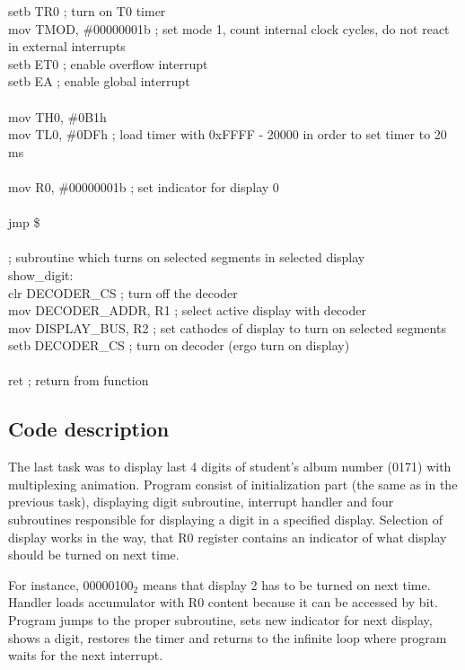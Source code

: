 \documentclass{article}
\begin{document}
    setb    TR0                 ; turn on T0 timer\\
    mov     TMOD, \#00000001b    ; set mode 1, count internal clock cycles, do not react in external interrupts\\
    setb    ET0                 ; enable overflow interrupt\\
    setb    EA                  ; enable global interrupt\\
\\
    mov     TH0, \#0B1h\\
    mov     TL0, \#0DFh          ; load timer with 0xFFFF - 20000 in order to set timer to 20 ms\\
\\
    mov     R0, \#00000001b      ; set indicator for display 0\\
\\
    jmp     \$\\
\\
; subroutine which turns on selected segments in selected display\\
show\_digit:\\
    clr     DECODER\_CS          ; turn off the decoder\\
    mov     DECODER\_ADDR, R1    ; select active display with decoder\\
    mov     DISPLAY\_BUS, R2     ; set cathodes of display to turn on selected segments\\
    setb    DECODER\_CS          ; turn on decoder (ergo turn on display)\\
\\
    ret                         ; return from function

\rmfamily

\newpage

\subsection{Code description}
The last task was to display last 4 digits of student's album number (0171) with multiplexing animation.
Program consist of initialization part (the same as in the previous task), displaying digit subroutine, interrupt handler and 
four subroutines responsible for displaying a digit in a specified display. Selection of display works
in the way, that R0 register contains an indicator of what display should be turned on next time.

For instance, 00000100$_2$ means that display 2 has to be turned on next time. Handler loads accumulator
with R0 content because it can be accessed by bit. Program jumps to the proper subroutine, sets new indicator for next display, shows a digit,
restores the timer and returns to the infinite loop where program waits for the next interrupt.
\end{document}
